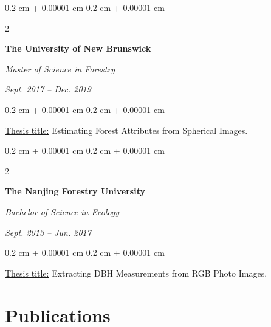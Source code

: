 \documentclass[10pt, a4paper]{article}
\newenvironment{highlights}{
    \begin{itemize}[
        topsep=0.10 cm,
        parsep=0.10 cm,
        partopsep=0pt,
        itemsep=0pt,
        leftmargin=0.4 cm + 10pt
    ]
}{
    \end{itemize}
} %
\newenvironment{onecolentry}{
    \begin{adjustwidth}{
        0.2 cm + 0.00001 cm
    }{
        0.2 cm + 0.00001 cm
    }
}{
    \end{adjustwidth}
} %
\newenvironment{twocolentry}[2][]{
    \onecolentry
    \def\secondColumn{#2}
    \setcolumnwidth{\fill, 4.5 cm}
    \begin{paracol}{2}
}{
    \switchcolumn \raggedleft \secondColumn
    \end{paracol}
    \endonecolentry
} %
\let\hrefWithoutArrow\href
\renewcommand{\href}[2]{\hrefWithoutArrow{#1}{\ifthenelse{\equal{#2}{}}{ }{#2 }\raisebox{.15ex}{\footnotesize \faExternalLink*}}}
\begin{document}
        \vspace{0.20 cm}

        \begin{twocolentry}{
            \textit{Sept. 2017 – Dec. 2019}}
            \textbf{The University of New Brunswick}

            \textit{Master of Science in Forestry}
        \end{twocolentry}

        \vspace{0.10 cm}
        \begin{onecolentry}
            \underline{Thesis title:} Estimating Forest Attributes from Spherical Images.
        \end{onecolentry}

        \vspace{0.20 cm}

        \begin{twocolentry}{
            \textit{Sept. 2013 – Jun. 2017}}
            \textbf{The Nanjing Forestry University}

            \textit{Bachelor of Science in Ecology}
        \end{twocolentry}

        \vspace{0.10 cm}
        \begin{onecolentry}
            \underline{Thesis title:} Extracting DBH Measurements from RGB Photo Images.
        \end{onecolentry}
    
    \section{Publications}
        \nocite{*}
\end{document}
